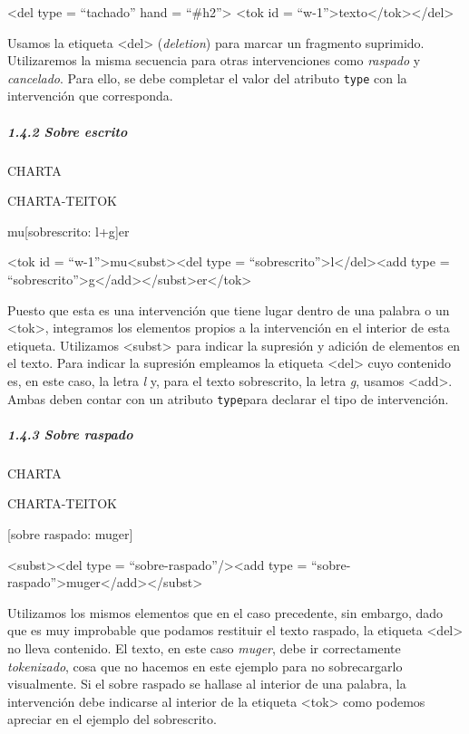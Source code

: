 \documentclass[
]{book}
\begin{document}
{\textless del} {type} {=} {``tachado''} {hand} {=} {``\#h2''}{\textgreater{}} {\textless tok} {id} {=} {``w-1''}{\textgreater{}}texto{\textless/tok\textgreater{}}{\textless/del\textgreater{}}

Usamos la etiqueta { \textless del\textgreater{}} (\emph{deletion}) para marcar un fragmento suprimido. Utilizaremos la misma secuencia para otras intervenciones como \emph{raspado} y \emph{cancelado}. Para ello, se debe completar el valor del atributo \texttt{type} con la intervención que corresponda.

\hypertarget{sobre-escrito}{%
\subparagraph*{1.4.2 Sobre escrito}\label{sobre-escrito}}

CHARTA

CHARTA-TEITOK

mu{[}sobrescrito: l+g{]}er

{\textless tok} {id} {=} {``w-1''}{\textgreater{}}{mu}{\textless subst\textgreater\textless del} {type} {=} {``sobrescrito''}{\textgreater{}}l{\textless/del\textgreater\textless add} {type} {=} {``sobrescrito''}{\textgreater{}}{g}{\textless/add\textgreater\textless/subst\textgreater{}}{er}{\textless/tok\textgreater{}}

Puesto que esta es una intervención que tiene lugar dentro de una palabra o un { \textless tok\textgreater{}}, integramos los elementos propios a la intervención en el interior de esta etiqueta. Utilizamos { \textless subst\textgreater{}} para indicar la supresión y adición de elementos en el texto. Para indicar la supresión empleamos la etiqueta { \textless del\textgreater{}} cuyo contenido es, en este caso, la letra \emph{l} y, para el texto sobrescrito, la letra \emph{g}, usamos { \textless add\textgreater{}}. Ambas deben contar con un atributo \texttt{type}para declarar el tipo de intervención.

\hypertarget{sobre-raspado}{%
\subparagraph*{1.4.3 Sobre raspado}\label{sobre-raspado}}

CHARTA

CHARTA-TEITOK

{[}sobre raspado: muger{]}

{\textless subst\textgreater{}}{\textless del} {type} {=} {``sobre-raspado''}{/\textgreater{}}{}{\textless add} {type} {=} {``sobre-raspado''}{\textgreater{}}muger{\textless/add\textgreater{}}{\textless/subst\textgreater{}}

Utilizamos los mismos elementos que en el caso precedente, sin embargo, dado que es muy improbable que podamos restituir el texto raspado, la etiqueta { \textless del\textgreater{}} no lleva contenido. El texto, en este caso \emph{muger}, debe ir correctamente \emph{tokenizado}, cosa que no hacemos en este ejemplo para no sobrecargarlo visualmente. Si el sobre raspado se hallase al interior de una palabra, la intervención debe indicarse al interior de la etiqueta { \textless tok\textgreater{}} como podemos apreciar en el ejemplo del sobrescrito.
\end{document}
